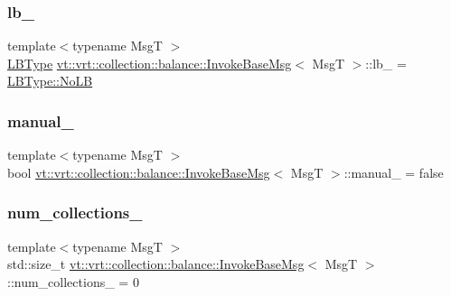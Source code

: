 \subsubsection{\texorpdfstring{lb\+\_\+}{lb\_}}
{\footnotesize\ttfamily template$<$typename MsgT $>$ \\
\hyperlink{namespacevt_1_1vrt_1_1collection_1_1balance_ac4f99693509affcc67db182d4aad9b5c}{L\+B\+Type} \hyperlink{structvt_1_1vrt_1_1collection_1_1balance_1_1_invoke_base_msg}{vt\+::vrt\+::collection\+::balance\+::\+Invoke\+Base\+Msg}$<$ MsgT $>$\+::lb\+\_\+ = \hyperlink{namespacevt_1_1vrt_1_1collection_1_1balance_ac4f99693509affcc67db182d4aad9b5cad12268b59a4f1098aee001f9a1750020}{L\+B\+Type\+::\+No\+LB}}

\mbox{\label{structvt_1_1vrt_1_1collection_1_1balance_1_1_invoke_base_msg_ab10a289092c060da9ab3f3d0cc4fe4b3}} 
\subsubsection{\texorpdfstring{manual\+\_\+}{manual\_}}
{\footnotesize\ttfamily template$<$typename MsgT $>$ \\
bool \hyperlink{structvt_1_1vrt_1_1collection_1_1balance_1_1_invoke_base_msg}{vt\+::vrt\+::collection\+::balance\+::\+Invoke\+Base\+Msg}$<$ MsgT $>$\+::manual\+\_\+ = false}

\mbox{\label{structvt_1_1vrt_1_1collection_1_1balance_1_1_invoke_base_msg_af4a7e6931f2d011e8df902ebcbea7ca8}} 
\subsubsection{\texorpdfstring{num\+\_\+collections\+\_\+}{num\_collections\_}}
{\footnotesize\ttfamily template$<$typename MsgT $>$ \\
std\+::size\+\_\+t \hyperlink{structvt_1_1vrt_1_1collection_1_1balance_1_1_invoke_base_msg}{vt\+::vrt\+::collection\+::balance\+::\+Invoke\+Base\+Msg}$<$ MsgT $>$\+::num\+\_\+collections\+\_\+ = 0}

